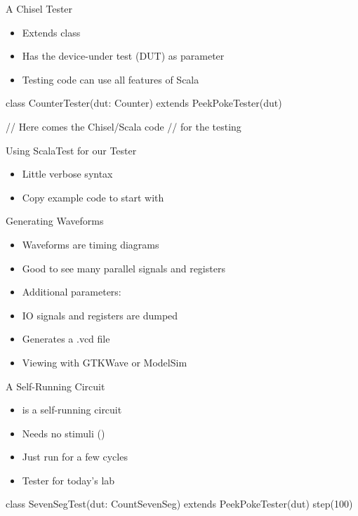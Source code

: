 \begin{frame}[fragile]{A Chisel Tester}
\begin{itemize}
\item Extends class 
\item Has the device-under test (DUT) as parameter
\item Testing code can use all features of Scala
\end{itemize}
\begin{chisel}
class CounterTester(dut: Counter) extends PeekPokeTester(dut) {

  // Here comes the Chisel/Scala code
  // for the testing
}
\end{chisel}
\end{frame}

\begin{frame}[fragile]{Using ScalaTest for our Tester}
\begin{itemize}
\item Little verbose syntax
\item Copy example code to start with
\end{itemize}
\end{frame}

\begin{frame}[fragile]{Generating Waveforms}
\begin{itemize}
\item Waveforms are timing diagrams
\item Good to see many parallel signals and registers
\item Additional parameters: 
\item IO signals and registers are dumped
\item Generates a .vcd file
\item Viewing with GTKWave or ModelSim
\end{itemize}
\end{frame}

\begin{frame}[fragile]{A Self-Running Circuit}
\begin{itemize}
\item {} is a self-running circuit
\item Needs no stimuli ()
\item Just run for a few cycles
\item Tester for today's lab
\end{itemize}
\begin{chisel}
class SevenSegTest(dut: CountSevenSeg) extends PeekPokeTester(dut) {
  step(100)
}
\end{chisel}
\end{frame}

